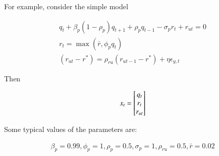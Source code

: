 For example, consider the simple model


\begin{gather*}
q_{t} +\beta_p(1 - \rho_p)q_{t + 1} + \rho_pq_{t - 1} - \sigma_pr_{t} +
     r_{ut}=0\\
 r_{t} = \max (\bar{r}, \phi_pq_{t}) \\
 (r_{ut}-r^\ast) = \rho_{ru} (r_{ut - 1}-r^\ast) + \eta \epsilon_{y,t}
\end{gather*}

Then 


\begin{gather*}
  x_t=\begin{bmatrix} q_t\\r_{t}\\r_{ut} \end{bmatrix}
\end{gather*}


Some typical values of the parameters are:

\begin{gather*}
  \beta_p = 0.99, \phi_p = 1, 
\rho_p = 0.5, \sigma_p = 1, \rho_{ru} = 0.5,
  \bar{r} = 0.02 \\
\end{gather*}

%
